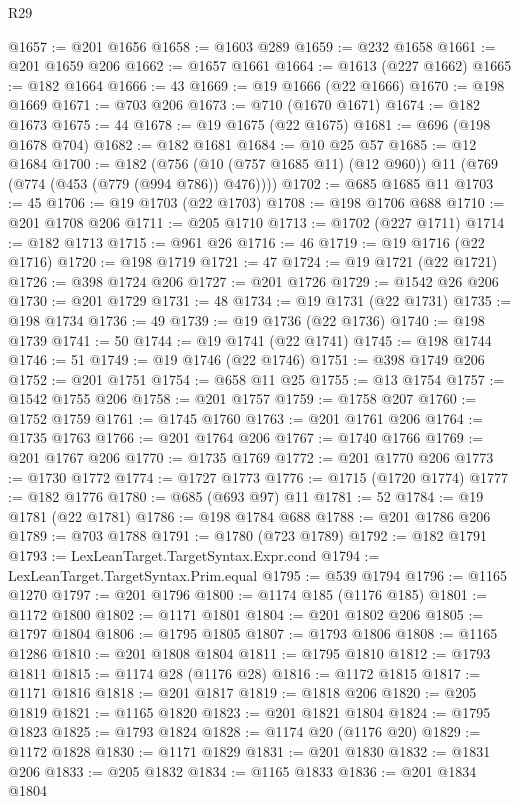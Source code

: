 \begin{lexlean}{R29}
\begin{coremodule}
@1657 := @201 @1656
@1658 := @1603 @289
@1659 := @232 @1658
@1661 := @201 @1659 @206
@1662 := @1657 @1661
@1664 := @1613 (@227 @1662)
@1665 := @182 @1664
@1666 := 43
@1669 := @19 @1666 (@22 @1666)
@1670 := @198 @1669
@1671 := @703 @206
@1673 := @710 (@1670 @1671)
@1674 := @182 @1673
@1675 := 44
@1678 := @19 @1675 (@22 @1675)
@1681 := @696 (@198 @1678 @704)
@1682 := @182 @1681
@1684 := @10 @25 @57
@1685 := @12 @1684
@1700 := @182
    (@756 (@10 (@757 @1685 @11) (@12 @960)) @11 (@769 (@774 (@453 (@779 (@994 @786)) @476))))
@1702 := @685 @1685 @11
@1703 := 45
@1706 := @19 @1703 (@22 @1703)
@1708 := @198 @1706 @688
@1710 := @201 @1708 @206
@1711 := @205 @1710
@1713 := @1702 (@227 @1711)
@1714 := @182 @1713
@1715 := @961 @26
@1716 := 46
@1719 := @19 @1716 (@22 @1716)
@1720 := @198 @1719
@1721 := 47
@1724 := @19 @1721 (@22 @1721)
@1726 := @398 @1724 @206
@1727 := @201 @1726
@1729 := @1542 @26 @206
@1730 := @201 @1729
@1731 := 48
@1734 := @19 @1731 (@22 @1731)
@1735 := @198 @1734
@1736 := 49
@1739 := @19 @1736 (@22 @1736)
@1740 := @198 @1739
@1741 := 50
@1744 := @19 @1741 (@22 @1741)
@1745 := @198 @1744
@1746 := 51
@1749 := @19 @1746 (@22 @1746)
@1751 := @398 @1749 @206
@1752 := @201 @1751
@1754 := @658 @11 @25
@1755 := @13 @1754
@1757 := @1542 @1755 @206
@1758 := @201 @1757
@1759 := @1758 @207
@1760 := @1752 @1759
@1761 := @1745 @1760
@1763 := @201 @1761 @206
@1764 := @1735 @1763
@1766 := @201 @1764 @206
@1767 := @1740 @1766
@1769 := @201 @1767 @206
@1770 := @1735 @1769
@1772 := @201 @1770 @206
@1773 := @1730 @1772
@1774 := @1727 @1773
@1776 := @1715 (@1720 @1774)
@1777 := @182 @1776
@1780 := @685 (@693 @97) @11
@1781 := 52
@1784 := @19 @1781 (@22 @1781)
@1786 := @198 @1784 @688
@1788 := @201 @1786 @206
@1789 := @703 @1788
@1791 := @1780 (@723 @1789)
@1792 := @182 @1791
@1793 := LexLeanTarget.TargetSyntax.Expr.cond
@1794 := LexLeanTarget.TargetSyntax.Prim.equal
@1795 := @539 @1794
@1796 := @1165 @1270
@1797 := @201 @1796
@1800 := @1174 @185 (@1176 @185)
@1801 := @1172 @1800
@1802 := @1171 @1801
@1804 := @201 @1802 @206
@1805 := @1797 @1804
@1806 := @1795 @1805
@1807 := @1793 @1806
@1808 := @1165 @1286
@1810 := @201 @1808 @1804
@1811 := @1795 @1810
@1812 := @1793 @1811
@1815 := @1174 @28 (@1176 @28)
@1816 := @1172 @1815
@1817 := @1171 @1816
@1818 := @201 @1817
@1819 := @1818 @206
@1820 := @205 @1819
@1821 := @1165 @1820
@1823 := @201 @1821 @1804
@1824 := @1795 @1823
@1825 := @1793 @1824
@1828 := @1174 @20 (@1176 @20)
@1829 := @1172 @1828
@1830 := @1171 @1829
@1831 := @201 @1830
@1832 := @1831 @206
@1833 := @205 @1832
@1834 := @1165 @1833
@1836 := @201 @1834 @1804

\end{coremodule}
\end{lexlean}
